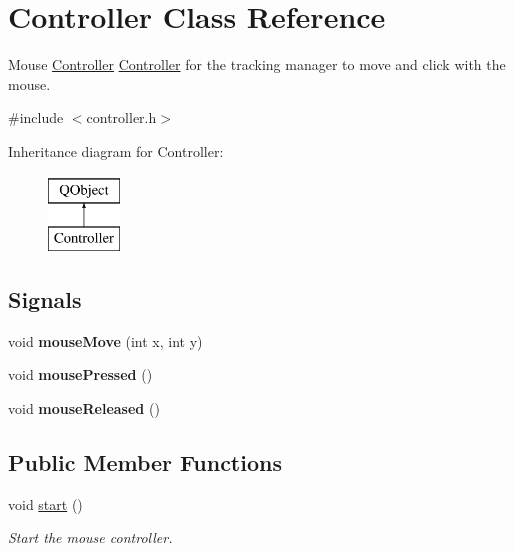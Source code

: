 \hypertarget{classController}{}\section{Controller Class Reference}
\label{classController}


Mouse \hyperlink{classController}{Controller} \hyperlink{classController}{Controller} for the tracking manager to move and click with the mouse.  




{\ttfamily \#include $<$controller.\+h$>$}

Inheritance diagram for Controller\+:\begin{figure}[H]
\begin{center}
\leavevmode
\includegraphics[height=2.000000cm]{classController}
\end{center}
\end{figure}
\subsection*{Signals}
\begin{DoxyCompactItemize}
\item 
\hypertarget{classController_a4ee924dd82f1dac68f65042926815459}{}void {\bfseries mouse\+Move} (int x, int y)\label{classController_a4ee924dd82f1dac68f65042926815459}

\item 
\hypertarget{classController_ae9849b36a3de09c52df01ec318f70f20}{}void {\bfseries mouse\+Pressed} ()\label{classController_ae9849b36a3de09c52df01ec318f70f20}

\item 
\hypertarget{classController_a45a023b8639b23060933b699ea51555f}{}void {\bfseries mouse\+Released} ()\label{classController_a45a023b8639b23060933b699ea51555f}

\end{DoxyCompactItemize}
\subsection*{Public Member Functions}
\begin{DoxyCompactItemize}
\item 
\hypertarget{classController_ad535ad74055e645b7f44b7feeb4e82a8}{}void \hyperlink{classController_ad535ad74055e645b7f44b7feeb4e82a8}{start} ()\label{classController_ad535ad74055e645b7f44b7feeb4e82a8}

\begin{DoxyCompactList}\small\item\em Start the mouse controller. \end{DoxyCompactList}\end{DoxyCompactItemize}


